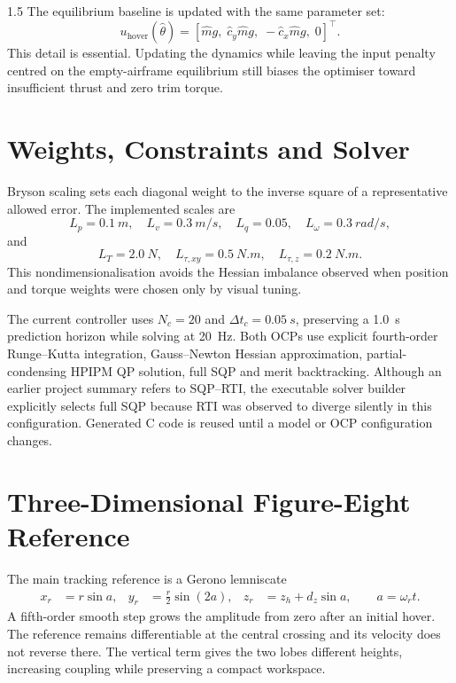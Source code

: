 \begin{spacing}{1.5}
The equilibrium baseline is updated with the same parameter set:
\begin{equation}
u_{\mathrm{hover}}(\hat\theta)=
[\hat m g,\;\hat c_y\hat m g,\;-\hat c_x\hat m g,\;0]^\top .
\end{equation}
This detail is essential. Updating the dynamics while leaving the input penalty centred on the empty-airframe equilibrium still biases the optimiser toward insufficient thrust and zero trim torque.

\section{Weights, Constraints and Solver}

Bryson scaling sets each diagonal weight to the inverse square of a representative allowed error. The implemented scales are
\[
L_p=\SI{0.1}{m},\quad
L_v=\SI{0.3}{m/s},\quad
L_q=0.05,\quad
L_\omega=\SI{0.3}{rad/s},
\]
and
\[
L_T=\SI{2.0}{N},\quad
L_{\tau,xy}=\SI{0.5}{N.m},\quad
L_{\tau,z}=\SI{0.2}{N.m}.
\]
This nondimensionalisation avoids the Hessian imbalance observed when position and torque weights were chosen only by visual tuning.

The current controller uses $N_c=20$ and $\Delta t_c=\SI{0.05}{s}$, preserving a \SI{1.0}{s} prediction horizon while solving at \SI{20}{Hz}. Both OCPs use explicit fourth-order Runge--Kutta integration, Gauss--Newton Hessian approximation, partial-condensing HPIPM QP solution, full SQP and merit backtracking. Although an earlier project summary refers to SQP--RTI, the executable solver builder explicitly selects full SQP because RTI was observed to diverge silently in this configuration. Generated C code is reused until a model or OCP configuration changes.

\section{Three-Dimensional Figure-Eight Reference}

The main tracking reference is a Gerono lemniscate
\begin{align}
x_r &= r\sin a, &
y_r &= \frac{r}{2}\sin(2a), &
z_r &= z_h+d_z\sin a,\qquad a=\omega_rt .
\end{align}
A fifth-order smooth step grows the amplitude from zero after an initial hover. The reference remains differentiable at the central crossing and its velocity does not reverse there. The vertical term gives the two lobes different heights, increasing coupling while preserving a compact workspace.


\end{spacing}
